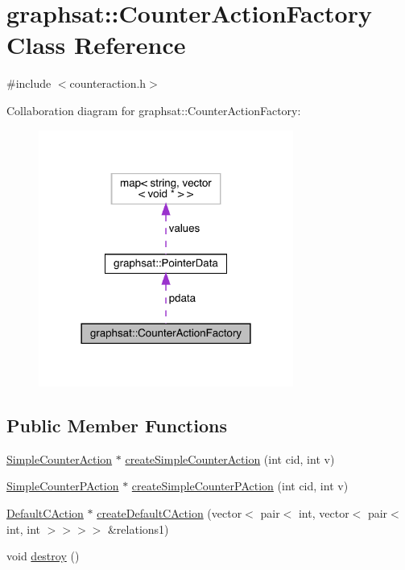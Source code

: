 \hypertarget{classgraphsat_1_1_counter_action_factory}{}\section{graphsat\+::Counter\+Action\+Factory Class Reference}
\label{classgraphsat_1_1_counter_action_factory}


{\ttfamily \#include $<$counteraction.\+h$>$}



Collaboration diagram for graphsat\+::Counter\+Action\+Factory\+:\nopagebreak
\begin{figure}[H]
\begin{center}
\leavevmode
\includegraphics[width=237pt]{classgraphsat_1_1_counter_action_factory__coll__graph}
\end{center}
\end{figure}
\subsection*{Public Member Functions}
\begin{DoxyCompactItemize}
\item 
\mbox{\hyperlink{classgraphsat_1_1_simple_counter_action}{Simple\+Counter\+Action}} $\ast$ \mbox{\hyperlink{classgraphsat_1_1_counter_action_factory_afbef0245be9501fe9ee39cd2538340c1}{create\+Simple\+Counter\+Action}} (int cid, int v)
\item 
\mbox{\hyperlink{classgraphsat_1_1_simple_counter_p_action}{Simple\+Counter\+P\+Action}} $\ast$ \mbox{\hyperlink{classgraphsat_1_1_counter_action_factory_a4bd75f27e6c64f7b2391504ccc506271}{create\+Simple\+Counter\+P\+Action}} (int cid, int v)
\item 
\mbox{\hyperlink{classgraphsat_1_1_default_c_action}{Default\+C\+Action}} $\ast$ \mbox{\hyperlink{classgraphsat_1_1_counter_action_factory_aec6aefcf28eaedeb5985cc31c8900b46}{create\+Default\+C\+Action}} (vector$<$ pair$<$ int, vector$<$ pair$<$ int, int $>$$>$$>$$>$ \&relations1)
\item 
void \mbox{\hyperlink{classgraphsat_1_1_counter_action_factory_a0fc2717a2818daca93d780a71aea82c2}{destroy}} ()
\end{DoxyCompactItemize}
